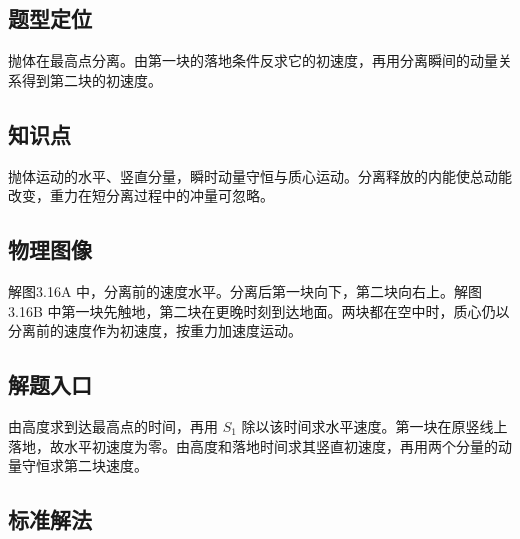 \documentclass[UTF8,fontset=fandol,a4paper,11pt]{ctexart}
\begin{document}

\subsection*{题型定位}

抛体在最高点分离。由第一块的落地条件反求它的初速度，再用分离瞬间的动量关系得到第二块的初速度。



\subsection*{知识点}

抛体运动的水平、竖直分量，瞬时动量守恒与质心运动。分离释放的内能使总动能改变，重力在短分离过程中的冲量可忽略。




\subsection*{物理图像}

解图3.16A 中，分离前的速度水平。分离后第一块向下，第二块向右上。解图3.16B 中第一块先触地，第二块在更晚时刻到达地面。两块都在空中时，质心仍以分离前的速度作为初速度，按重力加速度运动。



\subsection*{解题入口}

由高度求到达最高点的时间，再用 $S_1$ 除以该时间求水平速度。第一块在原竖线上落地，故水平初速度为零。由高度和落地时间求其竖直初速度，再用两个分量的动量守恒求第二块速度。



\subsection*{标准解法}
\end{document}
